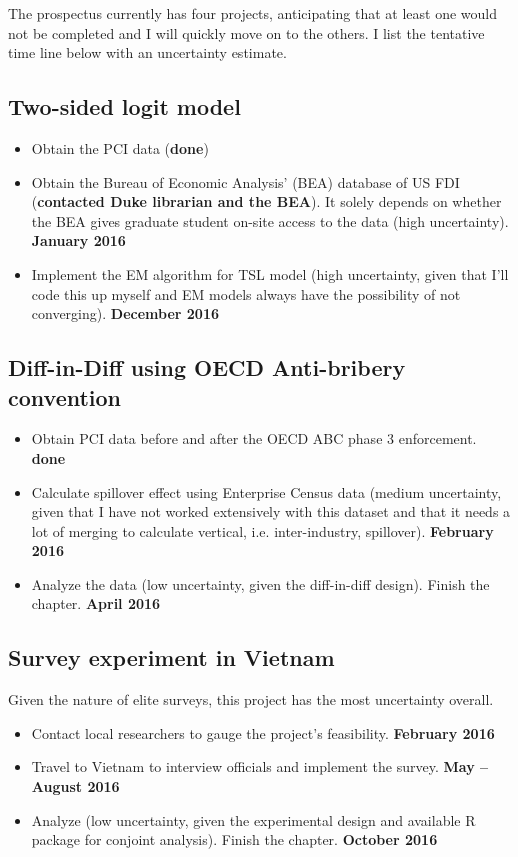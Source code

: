 The prospectus currently has four projects, anticipating that at least one would not be completed and I will quickly move on to the others. I list the tentative time line below with an uncertainty estimate.

\subsection{Two-sided logit model}
\begin{itemize}
\item Obtain the PCI data (\textbf{done})
\item Obtain the Bureau of Economic Analysis' (BEA) database of US FDI (\textbf{contacted Duke librarian and the BEA}). It solely depends on whether the BEA gives graduate student on-site access to the data (high uncertainty). \textbf{January 2016}
\item Implement the EM algorithm for TSL model (high uncertainty, given that I'll code this up myself and EM models always have the possibility of not converging). \textbf{December 2016}
\end{itemize}

\subsection{Diff-in-Diff using OECD Anti-bribery convention}

\begin{itemize}
\item Obtain PCI data before and after the OECD ABC phase 3 enforcement. \textbf{done}
\item Calculate spillover effect using Enterprise Census data (medium uncertainty, given that I have not worked extensively with this dataset and that it needs a lot of merging to calculate vertical, i.e. inter-industry, spillover). \textbf{February 2016}
\item Analyze the data (low uncertainty, given the diff-in-diff design). Finish the chapter. \textbf{April 2016}
\end{itemize}

\subsection{Survey experiment in Vietnam}

Given the nature of elite surveys, this project has the most uncertainty overall.

\begin{itemize}
\item Contact local researchers to gauge the project's feasibility. \textbf{February 2016}
\item Travel to Vietnam to interview officials and implement the survey. \textbf{May -- August 2016}
\item Analyze (low uncertainty, given the experimental design and available R package for conjoint analysis). Finish the chapter. \textbf{October 2016}
\end{itemize}

